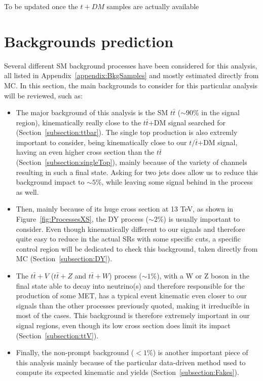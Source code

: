 \documentclass[a4paper, 10pt, openright]{report}
\begin{document}
\color{red} To be updated once the $t+DM$ samples are actually available \color{black}

\section{Backgrounds prediction} \label{section:Backgrounds}

Several different \ac{SM} background processes have been considered for this analysis, all listed in Appendix~\ref{appendix:BkgSamples} and mostly estimated directly from \ac{MC}. In this section, the main backgrounds to consider for this particular analysis will be reviewed, such as:

\begin{itemize}
\item The major background of this analysis is the \ac{SM} $t \bar t$ ($\sim 90\%$ in the signal region), kinematically really close to the $t \bar t$+DM signal searched for (Section~\ref{subsection:ttbar}). The single top production is also extremly important to consider, being kinematically close to our $t/\bar t$+DM signal, having an even higher cross section than the $t \bar t$ (Section~\ref{subsection:singleTop}), mainly because of the variety of channels resulting in such a final state. Asking for two jets does allow us to reduce this background impact to $\sim 5\%$, while leaving some signal behind in the process as well.
\item Then, mainly because of its huge cross section at 13 TeV, as shown in Figure~\ref{fig:ProcessesXS}, the \ac{DY} process ($\sim 2\%$) is usually important to consider. Even though kinematically different to our signals and therefore quite easy to reduce in the actual \acp{SR} with some specific cuts, a specific control region will be dedicated to check this background, taken directly from \ac{MC} (Section~\ref{subsection:DY}).
\item The $t \bar t + V$ ($t \bar t + Z$ and $t \bar t + W$) process ($\sim 1\%$), with a W or Z boson in the final state able to decay into neutrino(s) and therefore responsible for the production of some \ac{MET}, has a typical event kinematic even closer to our signals than the other processes previously quoted, making it irreducible in most of the cases. This background is therefore extremely important in our signal regions, even though its low cross section does limit its impact (Section~\ref{subsection:ttV}).
\item Finally, the non-prompt background ($< 1\%$) is another important piece of this analysis mainly because of the particular data-driven method used to compute its expected kinematic and yields (Section~\ref{subsection:Fakes}).
\end{itemize}
\end{document}

